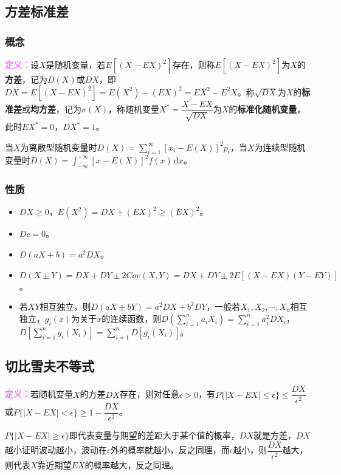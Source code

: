 \documentclass[UTF8, 12pt]{ctexart}
\begin{document}
\subsection{方差标准差}

\subsubsection{概念}

\textcolor{violet}{\textbf{定义：}}设$X$是随机变量，若$E[(X-EX)^2]$存在，则称$E[(X-EX)^2]$为$X$的\textbf{方差}，记为$D(X)$或$DX$，即$DX=E[(X-EX)^2]=E(X^2)-(EX)^2=EX^2-E^2X$。称$\sqrt{DX}$为$X$的\textbf{标准差}或\textbf{均方差}，记为$\sigma(X)$，称随机变量$X^*=\dfrac{X-EX}{\sqrt{DX}}$为$X$的\textbf{标准化随机变量}，此时$EX^*=0$，$DX^*=1$。

当$X$为离散型随机变量时$D(X)=\sum\limits_{i=1}^\infty[x_i-E(X)]^2p_i$，当$X$为连续型随机变量时$D(X)=\int_{-\infty}^{+\infty}[x-E(X)]^2f(x)\,\textrm{d}x$。

\subsubsection{性质}

\begin{itemize}
    \item $DX\geqslant0$，$E(X^2)=DX+(EX)^2\geqslant(EX)^2$。
    \item $Dc=0$。
    \item $D(aX+b)=a^2DX$。
    \item $D(X\pm Y)=DX+DY\pm2Cov(X,Y)=DX+DY\pm2E[(X-EX)(Y-EY)]$。
    \item 若$XY$相互独立，则$D(aX\pm bY)=a^2DX+b^2DY$，一般若$X_1,X_2,\cdots,X_n$相互独立，$g_i(x)$为关于$x$的连续函数，则$D\left(\sum\limits_{i=1}^na_iX_i\right)=\sum\limits_{i=1}^na_i^2DX_i$，$D\left[\sum\limits_{i=1}^ng_i(X_i)\right]=\sum\limits_{i=1}^nD[g_i(X_i)]$。
\end{itemize}

\subsection{切比雪夫不等式}

\textcolor{violet}{\textbf{定义：}}若随机变量$X$的方差$DX$存在，则对任意$\epsilon>0$，有$P\{\vert X-EX\vert\leqslant\epsilon\}\leqslant\dfrac{DX}{\epsilon^2}$或$P\{\vert X-EX\vert<\epsilon\}\geqslant1-\dfrac{DX}{\epsilon^2}$。

$P\{\vert X-EX\vert\geqslant\epsilon\}$即代表变量与期望的差距大于某个值的概率，$DX$就是方差，$DX$越小证明波动越小，波动在$\epsilon$外的概率就越小，反之同理，而$\epsilon$越小，则$\dfrac{DX}{\epsilon^2}$越大，则代表$X$靠近期望$EX$的概率越大，反之同理。
\end{document}
